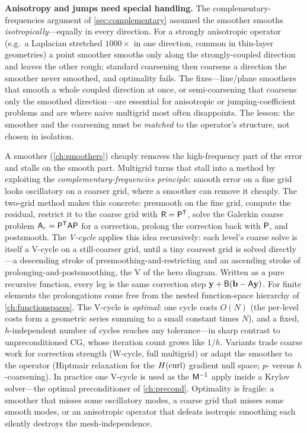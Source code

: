 \begin{pitfall}
\textbf{Anisotropy and jumps need special handling.} The complementary-frequencies argument of
\cref{sec:complementary} assumed the smoother smooths \emph{isotropically}---equally in every
direction. For a strongly anisotropic operator (e.g.\ a Laplacian stretched
$1000\times$ in one direction, common in thin-layer geometries) a point smoother smooths only
along the strongly-coupled direction and leaves the other rough; standard coarsening then
coarsens a direction the smoother never smoothed, and optimality fails. The fixes---line/plane
smoothers that smooth a whole coupled direction at once, or semi-coarsening that coarsens only
the smoothed direction---are essential for anisotropic or jumping-coefficient problems and are
where naive multigrid most often disappoints. The lesson: the smoother and the coarsening must
be \emph{matched} to the operator's structure, not chosen in isolation.
\end{pitfall}

\summarysection
A smoother (\cref{ch:smoothers}) cheaply removes the high-frequency part of the error and
stalls on the smooth part. Multigrid turns that stall into a method by exploiting the
\emph{complementary-frequencies principle}: smooth error on a fine grid looks oscillatory on a
coarser grid, where a smoother can remove it cheaply. The two-grid method makes this concrete:
presmooth on the fine grid, compute the residual, restrict it to the coarse grid with
$\mathsf{R}=\mathsf{P}^{\mathsf T}$, solve the Galerkin coarse problem $\mathsf{A}_c=\mathsf{P}^{\mathsf
T}\mathsf{A}\mathsf{P}$ for a correction, prolong the correction back with $\mathsf{P}$, and postsmooth.
The \emph{V-cycle} applies this idea recursively: each level's coarse solve is itself a V-cycle
on a still-coarser grid, until a tiny coarsest grid is solved directly---a descending stroke of
presmoothing-and-restricting and an ascending stroke of prolonging-and-postsmoothing, the V of
the hero diagram. Written as a pure recursive function, every leg is the same correction step
$\mathbf{y} + \mathsf{B}(\mathbf{b}-\mathsf{A}\mathbf{y})$. For finite elements the prolongations come free from the nested
function-space hierarchy of \cref{ch:functionspaces}. The V-cycle is \emph{optimal}: one cycle
costs $O(N)$ (the per-level costs form a geometric series summing to a small constant times $N$),
and a fixed, $h$-independent number of cycles reaches any tolerance---in sharp contrast to
unpreconditioned CG, whose iteration count grows like $1/h$. Variants trade coarse work for
correction strength (W-cycle, full multigrid) or adapt the smoother to the operator (Hiptmair
relaxation for the $H(\mathrm{curl})$ gradient null space; $p$- versus $h$-coarsening). In practice one
V-cycle is used as the $\mathsf{M}^{-1}$ apply inside a Krylov solver---the optimal preconditioner
of \cref{ch:precond}. Optimality is fragile: a smoother that misses some oscillatory modes, a
coarse grid that misses some smooth modes, or an anisotropic operator that defeats isotropic
smoothing each silently destroys the mesh-independence.

